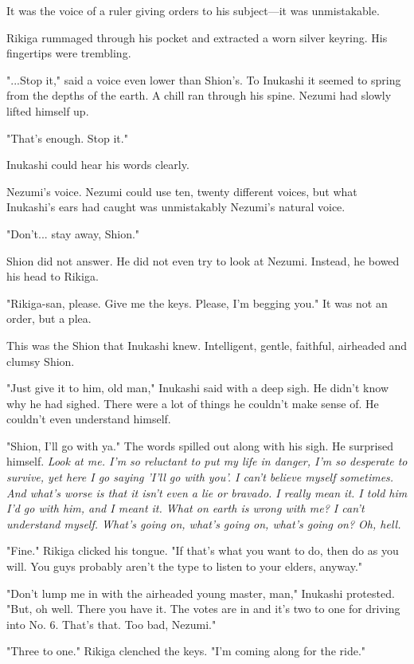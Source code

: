 It was the voice of a ruler giving orders to his subject---it was
unmistakable.

Rikiga rummaged through his pocket and extracted a worn silver keyring.
His fingertips were trembling.

"...Stop it," said a voice even lower than Shion's. To Inukashi it
seemed to spring from the depths of the earth. A chill ran through his
spine. Nezumi had slowly lifted himself up.

"That's enough. Stop it."

Inukashi could hear his words clearly.

Nezumi's voice. Nezumi could use ten, twenty different voices, but what
Inukashi's ears had caught was unmistakably Nezumi's natural voice.

"Don't... stay away, Shion."

Shion did not answer. He did not even try to look at Nezumi. Instead, he
bowed his head to Rikiga.

"Rikiga-san, please. Give me the keys. Please, I'm begging you." It was
not an order, but a plea.

This was the Shion that Inukashi knew. Intelligent, gentle, faithful,
airheaded and clumsy Shion.~

"Just give it to him, old man," Inukashi said with a deep sigh. He
didn't know why he had sighed. There were a lot of things he couldn't
make sense of. He couldn't even understand himself.

"Shion, I'll go with ya." The words spilled out along with his sigh. He
surprised himself. \emph{Look at me. I'm so reluctant to put my life in
danger, I'm so desperate to survive, yet here I go saying 'I'll go with
you'. I can't believe myself sometimes. And what's worse is that it
isn't even a lie or bravado. I really mean it. I told him I'd go with
him, and I meant it. What on earth is wrong with me? I can't understand
myself. What's going on, what's going on, what's going on? Oh, hell.}

"Fine." Rikiga clicked his tongue. "If that's what you want to do, then
do as you will. You guys probably aren't the type to listen to your
elders, anyway."

"Don't lump me in with the airheaded young master, man," Inukashi
protested. "But, oh well. There you have it. The votes are in and it's
two to one for driving into No. 6. That's that. Too bad, Nezumi."

"Three to one." Rikiga clenched the keys. "I'm coming along for the
ride."

